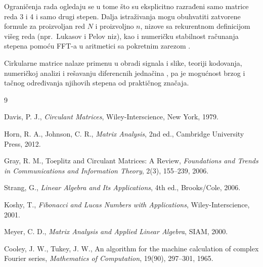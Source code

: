 \documentclass[12pt,a4paper]{report}
\begin{document}
Ograničenja rada ogledaju se u tome što su eksplicitno razrađeni samo
matrice reda 3 i 4 i samo drugi stepen. Dalja istraživanja mogu obuhvatiti
zatvorene formule za proizvoljan red $N$ i proizvoljno $n$, nizove sa
rekurentnom definicijom višeg reda (npr.\ Lukasov i Pelov niz), kao i
numeričku stabilnost računanja stepena pomoću FFT-a u aritmetici sa
pokretnim zarezom \cite{strang}.

Cirkularne matrice nalaze primenu u obradi signala i slike, teoriji
kodovanja, numeričkoj analizi i rešavanju diferencnih jednačina
\cite{gray, davis}, pa je mogućnost brzog i tačnog određivanja njihovih
stepena od praktičnog značaja.

\renewcommand{\bibname}{Literatura}
\begin{thebibliography}{9}
	
	 Davis, P. J., \textit{Circulant Matrices}, Wiley-Interscience, New York, 1979.
	
	 Horn, R. A., Johnson, C. R., \textit{Matrix Analysis}, 2nd ed., Cambridge University Press, 2012.
	
	 Gray, R. M., Toeplitz and Circulant Matrices: A Review, \textit{Foundations and Trends in Communications and Information Theory}, 2(3), 155--239, 2006.
	
	 Strang, G., \textit{Linear Algebra and Its Applications}, 4th ed., Brooks/Cole, 2006.
	
	 Koshy, T., \textit{Fibonacci and Lucas Numbers with Applications}, Wiley-Interscience, 2001.
	
	 Meyer, C. D., \textit{Matrix Analysis and Applied Linear Algebra}, SIAM, 2000.
	
	 Cooley, J. W., Tukey, J. W., An algorithm for the machine calculation of complex Fourier series, \textit{Mathematics of Computation}, 19(90), 297--301, 1965.
	
\end{thebibliography}
\end{document}
